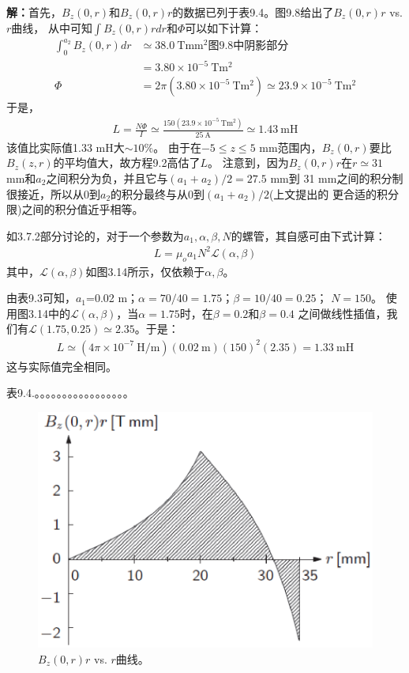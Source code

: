 \textbf{解：}首先，$B_z(0,r)$和$B_z(0,r)r$的数据已列于表9.4。图9.8给出了$B_z(0,r)r$ vs. $r$曲线，
从中可知$\int B_z(0,r)rdr$和$\Phi$可以如下计算：
\begin{align*}%
\int_{0}^{a_2}B_z(0,r)dr&\simeq 38.0\ \mathrm{T mm^2}\mbox{图9.8中阴影部分}\\
&=3.80\times 10^{-5}\ \mathrm{Tm^2}\\
\Phi&=2\pi(3.80\times 10^{-5}\ \mathrm{Tm^2})\simeq 23.9\times 10^{-5}\ \mathrm{Tm^2}
\end{align*}
于是，
\begin{align*}%
L=\frac{N\Phi}{I}\simeq\frac{150(23.9\times 10^{-5}\ \mathrm{Tm^2})}{25\ \mathrm{A}}\simeq 1.43\ \mathrm{mH}
\end{align*}
该值比实际值1.33 mH大$\sim 10\%$。
由于在$-5\le z\le 5$ mm范围内，$B_z(0,r)$要比$B_z(z,r)$的平均值大，故方程9.2高估了$L$。
注意到，因为$B_z(0,r)r$在$r\simeq31$ mm和$a_2$之间积分为负，并且它与$(a_1+a_2)/2=27.5$ mm到
31 mm之间的积分制很接近，所以从0到$a_2$的积分最终与从0到$(a_1+a_2)/2$(上文提出的
更合适的积分限)之间的积分值近乎相等。

如3.7.2部分讨论的，对于一个参数为$a_1,\alpha,\beta,N$的螺管，其自感可由下式计算：
\begin{align*}%
L=\mu_oa_1N^2\mathcal{L}(\alpha,\beta) \tag{3.81}
\end{align*}
其中，$\mathcal{L}(\alpha,\beta)$如图3.14所示，仅依赖于$\alpha,\beta$。

由表9.3可知，$a_1$=0.02 m；$\alpha=70/40=1.75$；$\beta=10/40=0.25$；
$N=150$。
使用图3.14中的$\mathcal{L}(\alpha,\beta)$，当$\alpha=1.75$时，在$\beta=0.2$和$\beta=0.4$
之间做线性插值，我们有$\mathcal{L}(1.75,0.25)\simeq2.35$。于是：
\begin{align*}%
L\simeq(4\pi\times 10^{-7}\ \mathrm{H/m})(0.02\ \mathrm{m})(150)^2(2.35)=1.33\ \mathrm{mH}
\end{align*}
这与实际值完全相同。


表9.4.。。。。。。。。。。。。。。。。。


\begin{figure}
	\centering
	\includegraphics[scale=0.5]{chpt9/figs/fig9.8.eps}
	\caption{$B_z(0,r)r$ vs. $r$曲线。}
\end{figure}


